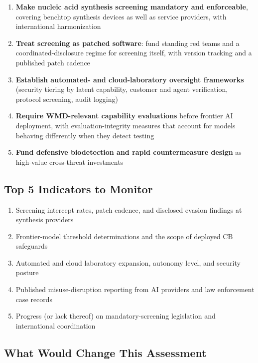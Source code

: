 \documentclass[11pt,letterpaper]{article}
\begin{document}
\begin{enumerate}
  \item \textbf{Make nucleic acid synthesis screening mandatory and enforceable}, covering benchtop synthesis devices as well as service providers, with international harmonization
  \item \textbf{Treat screening as patched software}: fund standing red teams and a coordinated-disclosure regime for screening itself, with version tracking and a published patch cadence
  \item \textbf{Establish automated- and cloud-laboratory oversight frameworks} (security tiering by latent capability, customer and agent verification, protocol screening, audit logging)
  \item \textbf{Require WMD-relevant capability evaluations} before frontier AI deployment, with evaluation-integrity measures that account for models behaving differently when they detect testing
  \item \textbf{Fund defensive biodetection and rapid countermeasure design} as high-value cross-threat investments
\end{enumerate}

\subsection*{Top 5 Indicators to Monitor}

\begin{enumerate}
  \item Screening intercept rates, patch cadence, and disclosed evasion findings at synthesis providers
  \item Frontier-model threshold determinations and the scope of deployed CB safeguards
  \item Automated and cloud laboratory expansion, autonomy level, and security posture
  \item Published misuse-disruption reporting from AI providers and law enforcement case records
  \item Progress (or lack thereof) on mandatory-screening legislation and international coordination
\end{enumerate}

\subsection*{What Would Change This Assessment}
\end{document}
